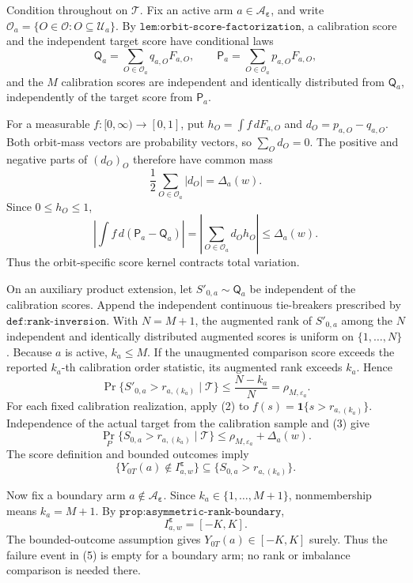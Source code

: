 Condition throughout on \(\mathcal T\). Fix an active arm \(a\in\mathcal A_{\boldsymbol\varepsilon}\), and write \(\mathcal O_a=\{O\in\mathcal O:O\subseteq\mathcal U_a\}\). By \(\texttt{lem:orbit-score-factorization}\), a calibration score and the independent target score have conditional laws
\[
\mathsf Q_a=\sum_{O\in\mathcal O_a}q_{a,O}F_{a,O},\qquad
\mathsf P_a=\sum_{O\in\mathcal O_a}p_{a,O}F_{a,O},
\tag{1}
\]
and the \(M\) calibration scores are independent and identically distributed from \(\mathsf Q_a\), independently of the target score from \(\mathsf P_a\).

For a measurable \(f:[0,\infty)\to[0,1]\), put \(h_O=\int f\,dF_{a,O}\) and \(d_O=p_{a,O}-q_{a,O}\). Both orbit-mass vectors are probability vectors, so \(\sum_Od_O=0\). The positive and negative parts of \((d_O)_O\) therefore have common mass
\[
\frac12\sum_{O\in\mathcal O_a}|d_O|=\Delta_a(w).
\]
Since \(0\le h_O\le1\),
\[
\left|\int f\,d(\mathsf P_a-\mathsf Q_a)\right|
=\left|\sum_{O\in\mathcal O_a}d_Oh_O\right|
\le\Delta_a(w).
\tag{2}
\]
Thus the orbit-specific score kernel contracts total variation.

On an auxiliary product extension, let \(S'_{0,a}\sim\mathsf Q_a\) be independent of the calibration scores. Append the independent continuous tie-breakers prescribed by \(\texttt{def:rank-inversion}\). With \(N=M+1\), the augmented rank of \(S'_{0,a}\) among the \(N\) independent and identically distributed augmented scores is uniform on \(\{1,\ldots,N\}\). Because \(a\) is active, \(k_a\le M\). If the unaugmented comparison score exceeds the reported \(k_a\)-th calibration order statistic, its augmented rank exceeds \(k_a\). Hence
\[
\Pr\{S'_{0,a}>r_{a,(k_a)}\mid\mathcal T\}
\le\frac{N-k_a}{N}=\rho_{M,\varepsilon_a}.
\tag{3}
\]
For each fixed calibration realization, apply (2) to \(f(s)=\mathbf1\{s>r_{a,(k_a)}\}\). Independence of the actual target from the calibration sample and (3) give
\[
\Pr_P\{S_{0,a}>r_{a,(k_a)}\mid\mathcal T\}
\le\rho_{M,\varepsilon_a}+\Delta_a(w).
\tag{4}
\]
The score definition and bounded outcomes imply
\[
\{Y_{0T}(a)\notin I^{\boldsymbol\varepsilon}_{a,w}\}
\subseteq\{S_{0,a}>r_{a,(k_a)}\}.
\tag{5}
\]

Now fix a boundary arm \(a\notin\mathcal A_{\boldsymbol\varepsilon}\). Since \(k_a\in\{1,\ldots,M+1\}\), nonmembership means \(k_a=M+1\). By \(\texttt{prop:asymmetric-rank-boundary}\),
\[
I^{\boldsymbol\varepsilon}_{a,w}=[-K,K].
\tag{6}
\]
The bounded-outcome assumption gives \(Y_{0T}(a)\in[-K,K]\) surely. Thus the failure event in (5) is empty for a boundary arm; no rank or imbalance comparison is needed there.

